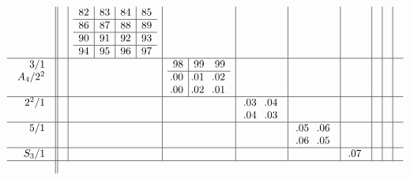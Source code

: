\documentclass[12pt,a4paper]{amsart}
\begin{document}
\begin{align*}
\begin{array}{r||c|c|c|c|c|c|c|c|c}
\begin{array}{r}
    \end{array}
&&
   \begin{array}{c|c|c|c}
     82&83&84&85\\
\hline
86&87&88&89\\
\hline
90&91&92&93\\
\hline
94&95&96&97\\
   \end{array}
&&&&&&& \\\hline
    \begin{array}{r}
      3/1 \\ A_4/2^2 \\ \\
    \end{array}
&&&
    \begin{array}{c|cc}
      98&99&99\\
\hline
\llap.00&\llap.01&\llap.02\\
\llap.00&\llap.02&\llap.01\\
    \end{array}
&&&&&& \\\hline
    \begin{array}{r}
      2^2/1 \\ \\
    \end{array}
&&&&
    \begin{array}{cc}
\llap.03&\llap.04\\
\llap.04&\llap.03\\
    \end{array}
&&&&& \\\hline
    \begin{array}{r}
      5/1 \\ \\
    \end{array}
&&&&&
    \begin{array}{cc}
\llap.05&\llap.06\\
\llap.06&\llap.05\\
    \end{array}
&&&& \\\hline
    \begin{array}{r}
      S_3/1 \\
    \end{array}
&&&&&&
    \begin{array}{c}
\llap.07\\
    \end{array}
&&& \\\hline
    \begin{array}{r}

\end{array}
\end{array}
\end{align*}
\end{document}
